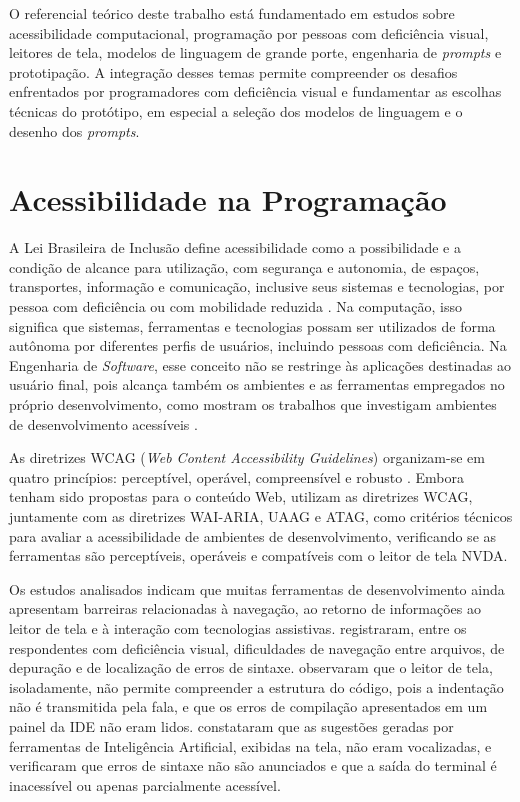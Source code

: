 \documentclass[
    12pt,                   %
    openright,              %
    oneside,                %
    a4paper,                %
    sumario=tradicional,    %
    english,                %
    brazil,                 %
    ]{abntex2}
\begin{document}
O referencial teórico deste trabalho está fundamentado em estudos sobre acessibilidade computacional, programação por pessoas com deficiência visual, leitores de tela, modelos de linguagem de grande porte, engenharia de \textit{prompts} e prototipação. A integração desses temas permite compreender os desafios enfrentados por programadores com deficiência visual e fundamentar as escolhas técnicas do protótipo, em especial a seleção dos modelos de linguagem e o desenho dos \textit{prompts}.

\section{Acessibilidade na Programação}\label{sec:AcessComputacao}

A Lei Brasileira de Inclusão define acessibilidade como a possibilidade e a condição de alcance para utilização, com segurança e autonomia, de espaços, transportes, informação e comunicação, inclusive seus sistemas e tecnologias, por pessoa com deficiência ou com mobilidade reduzida \cite{brasil2015lbi}. Na computação, isso significa que sistemas, ferramentas e tecnologias possam ser utilizados de forma autônoma por diferentes perfis de usuários, incluindo pessoas com deficiência. Na Engenharia de \textit{Software}, esse conceito não se restringe às aplicações destinadas ao usuário final, pois alcança também os ambientes e as ferramentas empregados no próprio desenvolvimento, como mostram os trabalhos que investigam ambientes de desenvolvimento acessíveis \cite{latinoware37693,latinoware6969}.

As diretrizes WCAG (\textit{Web Content Accessibility Guidelines}) organizam-se em quatro princípios: perceptível, operável, compreensível e robusto \cite{w3c2024wcag22}. Embora tenham sido propostas para o conteúdo Web, \textcite{latinoware6969} utilizam as diretrizes WCAG, juntamente com as diretrizes WAI-ARIA, UAAG e ATAG, como critérios técnicos para avaliar a acessibilidade de ambientes de desenvolvimento, verificando se as ferramentas são perceptíveis, operáveis e compatíveis com o leitor de tela NVDA.

Os estudos analisados indicam que muitas ferramentas de desenvolvimento ainda apresentam barreiras relacionadas à navegação, ao retorno de informações ao leitor de tela e à interação com tecnologias assistivas. \textcite{latinoware20457} registraram, entre os respondentes com deficiência visual, dificuldades de navegação entre arquivos, de depuração e de localização de erros de sintaxe. \textcite{acad54431201} observaram que o leitor de tela, isoladamente, não permite compreender a estrutura do código, pois a indentação não é transmitida pela fala, e que os erros de compilação apresentados em um painel da IDE não eram lidos. \textcite{latinoware34224} constataram que as sugestões geradas por ferramentas de Inteligência Artificial, exibidas na tela, não eram vocalizadas, e \textcite{latinoware6969} verificaram que erros de sintaxe não são anunciados e que a saída do terminal é inacessível ou apenas parcialmente acessível.
\end{document}
